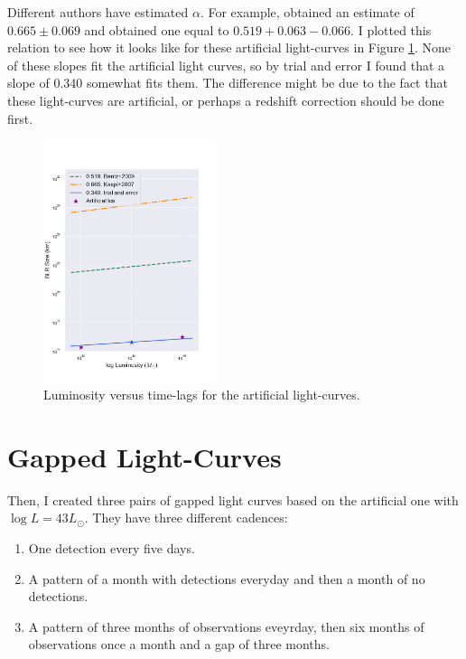 \documentclass[letterpaper, oneside]{article}
\begin{document}
Different authors have estimated $\alpha$. For example, \cite{Kaspi_2005} obtained an estimate of $0.665 \pm 0.069$ and \cite{Bentz_2009} obtained one equal to $0.519 + 0.063 - 0.066$. I plotted this relation to see how it looks like for these artificial light-curves in Figure \ref{fig:art_lum_vs_lag}. None of these slopes fit the artificial light curves, so by trial and error I found that a slope of 0.340 somewhat fits them. The difference might be due to the fact that these light-curves are artificial, or perhaps a redshift correction should be done first.

\begin{figure}[h]
	\centering
	\includegraphics[width=0.45\textwidth]{../other_plots/artificial_L_vs_timelag.pdf}
	\caption{Luminosity versus time-lags for the artificial light-curves.}
	\label{fig:art_lum_vs_lag}
\end{figure}


\section{Gapped Light-Curves}

Then, I created three pairs of gapped light curves based on the artificial one with $\log{L} = 43 L_{\odot}$. They have three different cadences:
\begin{enumerate}
	\item One detection every five days.
	
	\item A pattern of a month with detections everyday and then a month of no detections.
	
	\item A pattern of three months of observations eveyrday, then six months of observations once a month and a gap of three months.
	
\end{enumerate}
\end{document}
